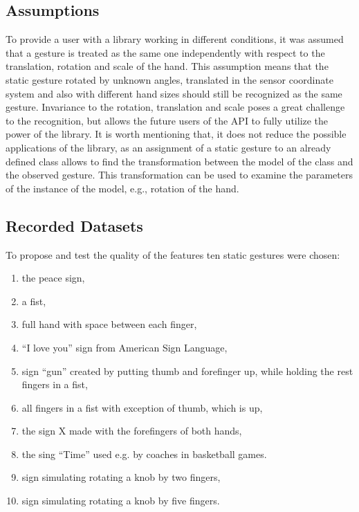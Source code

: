 \subsection{Assumptions}\label{staticAssumptions}
To provide a user with a library working in different conditions, it was assumed that a gesture is treated as the same one independently with respect to the translation, rotation and scale of the hand. 
This assumption means that the static gesture rotated by unknown angles, translated in the sensor coordinate system and also with different hand sizes should still be recognized as the same gesture.
Invariance to the rotation, translation and scale poses a great challenge to the recognition, but allows the future users of the API to fully utilize the power of the library.
It is worth mentioning that, it does not reduce the possible applications of the library, as an assignment of a static gesture to an already defined class allows to find the transformation between the model of the class and the observed gesture.
This transformation can be used to examine the parameters of the instance of the model, e.g., rotation of the hand.

\subsection{Recorded Datasets}

To propose and test the quality of the features ten static gestures were chosen:
\begin{enumerate}
\item the peace sign,
\item a fist,
\item full hand with space between each finger,
\item ``I love you'' sign from American Sign Language,
\item sign ``gun'' created by putting thumb and forefinger up, while holding the rest fingers in a fist,
\item all fingers in a fist with exception of thumb, which is up,
\item the sign X made with the forefingers of both hands,
\item the sing ``Time'' used e.g. by coaches in basketball games.
\item sign simulating rotating a knob by two fingers,
\item sign simulating rotating a knob by five fingers.
\end{enumerate} 

